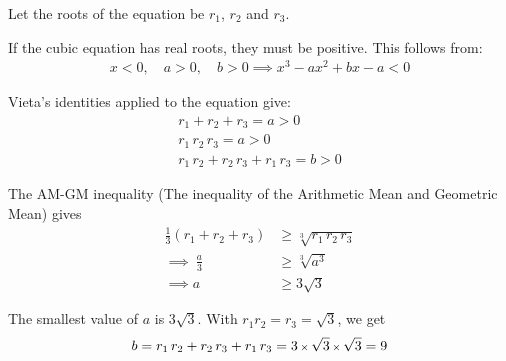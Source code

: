 Let the roots of the equation be $r_{1}$, $r_{2}$ and $r_{3}$. 

If the cubic equation has real roots, they must be positive. This follows from:
\begin{align*}
x < 0, \quad a > 0, \quad b > 0
\implies 
x^3 - ax^2 + bx - a < 0
\end{align*}

Vieta's identities applied to the equation give:
\begin{align*}
r_{1} + r_{2} + r_{3} 
= a > 0
\\
r_{1}\,r_{2}\,r_{3} 
= a > 0
\\
r_{1}\,r_{2} + r_{2}\,r_{3} + r_{1}\,r_{3}
= b > 0
\end{align*}

The AM-GM inequality (The inequality of the Arithmetic Mean and Geometric Mean) gives
\begin{align*}
\tfrac{1}{3}
(r_{1}+r_{2}+r_{3})
& \ge \sqrt[3]{r_{1}\,r_{2}\,r_{3}}
\\[1ex]
\implies\ 
\frac{a}{3}
& \ge \sqrt[3]{a^{3}}
\\[1ex]
\implies
a
& \ge 3 \sqrt{3}
\end{align*}

The smallest value of $a$ is $3\sqrt{3}$. With $r_{1}r_{2}=r_{3}=\sqrt{3}$, we get
\begin{align*}
b = r_{1}\,r_{2} + r_{2}\,r_{3} + r_{1}\,r_{3}
  = 3 \operatorname{\mbox{\scriptsize$\times$}} \sqrt{3} \operatorname{\mbox{\scriptsize$\times$}} \sqrt{3}
  = 9
\end{align*}
